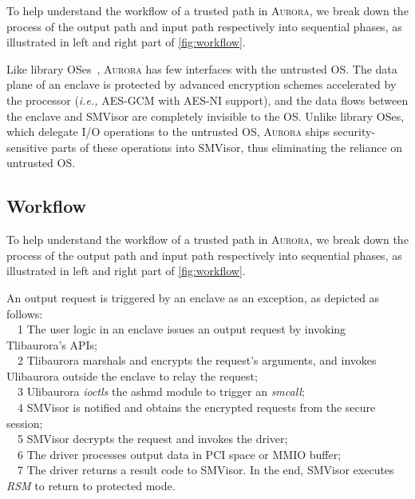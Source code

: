 \documentclass[journal,twocolumn,letterpaper,10pt]{IEEEtran}
\begin{document}
To help understand the workflow of a trusted path in \textsc{Aurora}, we break down the process of the output path and input path respectively into sequential phases, as illustrated in left and right part of \autoref{fig:workflow}.

Like library OSes~\cite{DBLP:journals/tocs/BaumannPH15, DBLP:conf/usenix/TsaiPV17, shinde_panoply:_2017}, \textsc{Aurora} has few interfaces with the untrusted OS. %
The data plane of an enclave is protected by advanced encryption schemes accelerated by the processor (\emph{i.e.,} AES-GCM with AES-NI support), and the data flows between the enclave and SMVisor are completely invisible to the OS. Unlike library OSes, which delegate I/O operations to the untrusted OS, \textsc{Aurora} ships security-sensitive parts of these operations into SMVisor, thus eliminating the reliance on untrusted OS.

\iffalse

\subsection{Workflow}\label{workflow}

To help understand the workflow of a trusted path in \textsc{Aurora}, we break down the process of the output path and input path respectively into sequential phases, as illustrated in left and right part of \autoref{fig:workflow}.

An output request is triggered by an enclave as an exception, as depicted as follows:\\
~~\textcircled{\footnotesize{1}} The user logic in an enclave issues an output request by invoking  Tlibaurora's APIs;\\
~~\textcircled{\footnotesize{2}} Tlibaurora marshals and encrypts the request's arguments, and invokes Ulibaurora outside the enclave to relay the request;\\ %
~~\textcircled{\footnotesize{3}} Ulibaurora \emph{ioctls} the ashmd module to trigger an \textit{smcall};\\
~~\textcircled{\footnotesize{4}} SMVisor is notified and obtains the encrypted requests from the secure session;\\
~~\textcircled{\footnotesize{5}} SMVisor decrypts the request and invokes the driver;\\
~~\textcircled{\footnotesize{6}} The driver processes output data in PCI space or MMIO buffer;\\
~~\textcircled{\footnotesize{7}} The driver returns a result code to SMVisor. In the end, SMVisor executes \textit{RSM} to return to protected mode. \\
\end{document}
